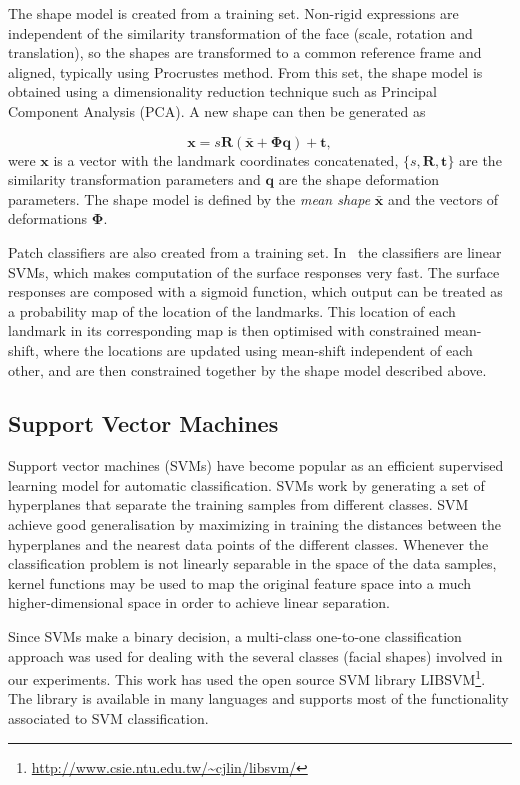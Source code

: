 \documentclass[]{article}
\begin{document}
The shape model is created from a training set. Non-rigid expressions are independent of the similarity transformation
of the face (scale, rotation and translation), so the shapes are transformed to a common reference frame and aligned,
typically using Procrustes method. From this set, the shape model is obtained using a dimensionality reduction technique
such as Principal Component Analysis (PCA). A new shape can then be generated as


\begin{equation}
  \label{eq:shape_model}
  \mathbf{x} = s\mathbf{R}(\bar{\mathbf{x}} +
  \boldsymbol{\Phi}\mathbf{q}) + \mathbf{t},
\end{equation}
were $\mathbf{x}$ is a vector with the landmark coordinates concatenated, 
$\{s,\mathbf{R},\mathbf{t}\}$ are the similarity transformation
parameters and $\mathbf{q}$ are the shape deformation parameters. The
shape model is defined by the \textit{mean shape} $\mathbf{\bar{x}}$
and the vectors of deformations $\boldsymbol{\Phi}$.


Patch classifiers are also created from a training set. In~\cite{saragih2011deformable} the classifiers are linear SVMs,
which makes computation of the surface responses very fast. The surface responses are composed with a sigmoid function,
which output can be treated as a probability map of the location of the landmarks. This location of each landmark in its
corresponding map is then optimised with constrained mean-shift, where the locations are updated using mean-shift
independent of each other, and are then constrained together by the shape model described above.


\subsection{Support Vector Machines}
Support vector machines (SVMs) have become popular as an efficient supervised learning model for automatic
classification. SVMs work by generating a set of hyperplanes that separate the training samples from different classes.
SVM achieve good generalisation by maximizing in training the distances between the hyperplanes and the nearest
data points of the different classes. Whenever the classification problem is not linearly separable in the
space of the data samples, kernel functions may be used to map the original feature space into a much
higher-dimensional space in order to achieve linear separation.

Since SVMs make a binary decision, a multi-class one-to-one classification approach was used for dealing with the
several classes (facial shapes) involved in our experiments. This work has used the open source SVM library
LIBSVM\footnote{\url{http://www.csie.ntu.edu.tw/~cjlin/libsvm/}}. The library is available in many languages and
supports most of the functionality associated to SVM classification.
\end{document}
